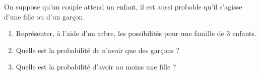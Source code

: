 
On suppose qu'un couple attend un enfant, il est aussi probable qu'il s'agisse d'une fille ou d'un garçon. 

\begin{enumerate}
\item Représenter, à l'aide d'un arbre, les possibilités pour une famille de 3 enfants.
\item Quelle est la probabilité de n'avoir que des garçons ?
\item Quelle est la probabilité d'avoir au moins une fille ?
\end{enumerate}